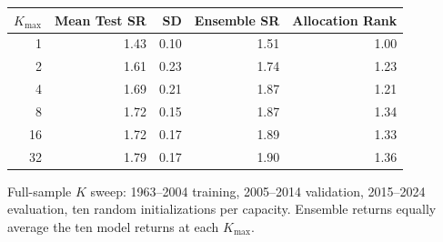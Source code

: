 \begin{threeparttable}
\begin{tabular}{rrrrr}
\toprule
$K_{\max}$ & Mean Test SR & SD & Ensemble SR & Allocation Rank \\
\midrule
1 & 1.43 & 0.10 & 1.51 & 1.00 \\
2 & 1.61 & 0.23 & 1.74 & 1.23 \\
4 & 1.69 & 0.21 & 1.87 & 1.21 \\
8 & 1.72 & 0.15 & 1.87 & 1.34 \\
16 & 1.72 & 0.17 & 1.89 & 1.33 \\
32 & 1.79 & 0.17 & 1.90 & 1.36 \\
\bottomrule
\end{tabular}
\begin{tablenotes}\footnotesize
\item Full-sample $K$ sweep: 1963--2004 training, 2005--2014 validation, 2015--2024 evaluation, ten random initializations per capacity. Ensemble returns equally average the ten model returns at each $K_{\max}$.
\end{tablenotes}
\end{threeparttable}
